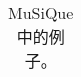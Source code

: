 \begin{table}[htbp]
    \centering
    \caption{MuSiQue中的例子。}
    \begin{tabular}{p{420pt}}

\end{tabular}
\end{table}
